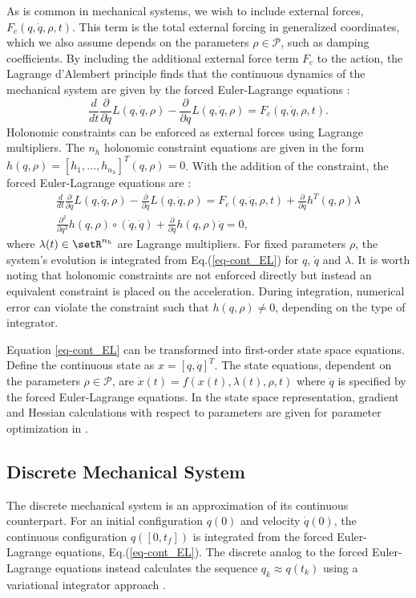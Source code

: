 \documentclass[letterpaper, 10pt, conference]{ieeeconf}
\begin{document}
As is common in mechanical systems, we wish to include external forces, $F_c(q,\dot{q},\rho,t)$.  This term is the total external forcing in generalized coordinates, which we also assume depends on the parameters $\rho\in\mathcal{P}$, such as damping coefficients.  By including the additional external force term $F_c$ to the action, the Lagrange d'Alembert principle finds that the continuous dynamics of the mechanical system are given by the forced Euler-Lagrange equations \cite{murray_li_sastry}:
\[
\frac{d}{d t}\frac{\partial}{\partial \dot{q}}L(q,\dot{q},\rho) - \frac{\partial}{\partial q}L(q,\dot{q},\rho) = F_c(q,\dot{q},\rho,t).
\]
Holonomic constraints can be enforced as external forces using Lagrange multipliers.  The $n_h$ holonomic constraint equations are given in the form $h(q,\rho)= [h_1,\ldots,h_{n_h}]^T(q,\rho) = 0$.  With the addition of the constraint, the forced Euler-Lagrange equations are \cite{murray_li_sastry}:
\begin{equation}
\begin{array}{c}
\frac{d}{d t}\frac{\partial}{\partial \dot{q}}L(q,\dot{q},\rho) - \frac{\partial}{\partial q}L(q,\dot{q},\rho) = F_c(q,\dot{q},\rho,t) + \frac{\partial}{\partial q}h^T(q,\rho)\lambda\\
\frac{\partial^2}{\partial q^2}h(q,\rho)\circ(\dot{q},\dot{q}) + \frac{\partial}{\partial q}h(q,\rho)\ddot{q} = 0,
\end{array}
\label{eq-cont_EL}
\end{equation}
where $\lambda(t)\in\setR^{n_h}$ are Lagrange multipliers.  For fixed parameters $\rho$, the system's evolution is integrated from Eq.(\ref{eq-cont_EL}) for $q$, $\dot{q}$ and $\lambda$.  It is worth noting that holonomic constraints are not enforced directly but instead an equivalent constraint is placed on the acceleration.  During integration, numerical error can violate the constraint such that  $h(q,\rho)\neq 0$, depending on the type of integrator.

Equation \ref{eq-cont_EL} can be transformed into first-order state space equations.  Define the continuous state as $x = [q,\dot{q}]^T$.  The state equations, dependent on the parameters $\rho\in\mathcal{P}$, are $\dot{x}(t) = f(x(t),\lambda(t),\rho,t)$ where $\ddot{q}$ is specified by the forced Euler-Lagrange equations.  In the state space representation, gradient and Hessian calculations with respect to parameters are given for parameter optimization in \cite{miller_murphey}.

\subsection{Discrete Mechanical System}
The discrete mechanical system is an approximation of its continuous counterpart.  For an initial configuration $q(0)$ and velocity $\dot{q}(0)$, the continuous configuration $q([0,t_f])$ is integrated from the forced Euler-Lagrange equations, Eq.(\ref{eq-cont_EL}).  The discrete analog to the forced Euler-Lagrange equations instead calculates the sequence $q_k\approx q(t_k)$ using a variational integrator approach \cite{johnson_murphey_scalable}.  
\end{document}
